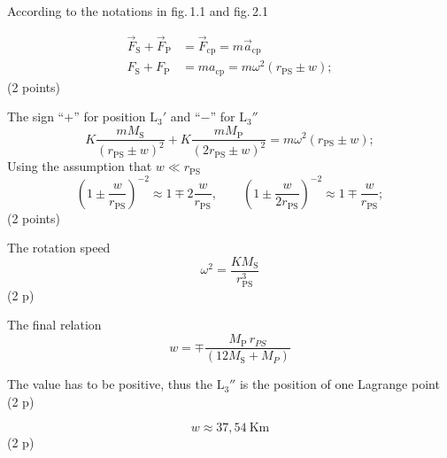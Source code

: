 According to the notations in fig.\,1.1 and fig.\,2.1 %

\begin{align*}
  \vec{F}_{\mathrm{S}} + \vec{F}_{\mathrm{P}}
    &= \vec{F}_{\mathrm{cp}} = m\vec{a}_{\mathrm{cp}} \\
  F_{\mathrm{S}} + F_{\mathrm{P}}
    &= ma_{\mathrm{cp}} = m\omega^2\left(r_{\mathrm{PS}} \pm w\right);
\end{align*}
\hfill(2 points)

The sign ``$+$'' for position $\mathrm{L}_3'$ and ``$-$'' for $\mathrm{L}_3''$
\[
  K\frac{mM_{\mathrm{S}}}{\left(r_{\mathrm{PS}} \pm w\right)^2}
  + K\frac{mM_{\mathrm{P}}}{\left(2r_{\mathrm{PS}} \pm w\right)^2}
  = m\omega^2\left(r_{\mathrm{PS}} \pm w\right);
\]
Using the assumption that $w \ll r_{\mathrm{PS}}$
\[
  \left(1 \pm \frac{w}{r_{\mathrm{PS}}}\right)^{-2}
  \approx 1 \mp 2\frac{w}{r_{\mathrm{PS}}}, \qquad
  \left(1 \pm \frac{w}{2r_{\mathrm{PS}}}\right)^{-2}
  \approx 1 \mp \frac{w}{r_{\mathrm{PS}}};
\]
\hfill(2 points)

The rotation speed
\[ \omega^2 = \frac{KM_{\mathrm{S}}}{r_{\mathrm{PS}}^3} \]
\hfill(2 p)

The final relation
\[ w = \mp \frac{M_{\mathrm{P}}\, r_{PS}}{\left(12M_{\mathrm{S}} + M_{P}\right)} \]

The value has to be positive, thus the $\mathrm{L}_3''$ is the position of one
Lagrange point \hfill(2 p)

\[ w \approx 37{,}54\ \mathrm{Km} \]
\hfill(2 p)
